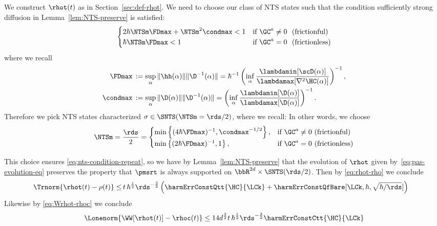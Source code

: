 \documentclass{article}
\numberwithin{equation}{section}
\begin{document}
We construct $\rhot(t)$ as in Section~\ref{sec:def-rhot}.  We need to choose our class of NTS states such that the condition sufficiently strong diffusion in Lemma~\ref{lem:NTS-preserve} is satisfied: 
\begin{align}\label{eq:nts-condition-repeat}
    \begin{cases}
      2 \hbar \NTSm \FDmax +  \NTSm^2 \condmax < 1 & \text{if}\ \GC^a \neq 0 \,\,\,\, \text{(frictionful)} \\
      \hbar \NTSm \FDmax < 1 & \text{if}\ \GC^a = 0 \,\,\,\, \text{(frictionless)}
    \end{cases}
\end{align}
where we recall 
\begin{align}
    \label{eq:fdmax-def-recall}
    \FDmax \, & :=  
    \sup_\alpha \|\hh(\alpha)\| \|\D^{-1}(\alpha)\| =  
    \hbar^{-1}\left(\inf_\alpha 
    \frac
    {\lambdamin[\scD(\alpha)]}{\lambdamax[\nabla^2\HC(\alpha)]}
    \right)^{-1},\\
    \label{eq:condmax-def-recall}
    \condmax \, & := \sup_\alpha \|\D(\alpha)\| \|\D^{-1}(\alpha)\| =  
    \left(\inf_\alpha \frac{\lambdamin[\D(\alpha)]}{\lambdamax[\D(\alpha)]}\right)^{-1}.
\end{align}
Therefore we pick NTS states characterized $\sigma\in\SNTS(\NTSm = \rds/2)$, where we recall:
\noindent In other words, we choose 
\begin{align}
    \NTSm = \frac{\rds}{2} = \begin{cases}
      \min\left\{(4\hbar\FDmax)^{-1}, \condmax^{-1/2}\right\}, & \text{if}\ \GC^a \neq 0 \,\, \text{(frictionful)} \\
      \min\left\{(2\hbar\FDmax)^{-1}, 1 \right\}, & \text{if}\ \GC^a = 0 \,\, \text{(frictionless)}
    \end{cases}
\end{align}

This choice ensures \eqref{eq:nts-condition-repeat}, so we have by Lemma~\ref{lem:NTS-preserve} 
that the evolution of $\rhot$ given by~\eqref{eq:pas-evolution-eq} preserves the property that $\pmsrt$
is always supported on $\bbR^{2d}\times\SNTS(\rds/2)$.
Then by \eqref{eq:rhot-rho} we conclude
\begin{align}
\label{eq:rhot-rho-2}
\Trnorm{\rhot(t)-\rho(t)} 
    \le 
    &\, 
    t \,
    \hbar^{\frac12}\rds^{-\frac32}
    \left(
    \harmErrConstQtt{\HC}{\LCk}+\harmErrConstQfBare[\LCk,\hbar,\sqrt{\hbar/\rds}]
    \right)
\end{align}
Likewise by \eqref{eq:Wrhot-rhoc} we conclude
\begin{align}\label{eq:Wrhot-rhoc-2}
\Lonenorm{\WW[\rhot(t)]-\rhoc(t)} 
    \le 
    14 d^{\frac32}
    t \,
    \hbar^{\frac12}\rds^{-\frac32}
    \harmErrConstCtt{\HC}{\LCk}
\end{align}
\end{document}
